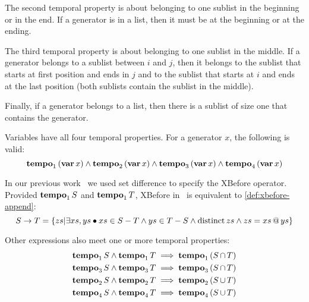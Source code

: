 \documentclass[12pt,openright,twoside,a4paper,oldfontcommands,english,brazil,final]{abntex2}
\makeatletter
\newtheorem{definition}{Definition}[chapter]
\theoremstyle{theo}
\def\varop{\ensuremath\operatorname{\mathbf{var}}}
\newcommand{\var}[1]{\ensuremath\varop #1}
\def\xbeforeop{\ensuremath\rightarrow}
\newcommand{\xbefore}[2]{\ensuremath #1 \xbeforeop #2 }
\def\Tempotext{Tempo\xspace}
\def\tempoop{\ensuremath\operatorname{\mathbf{tempo}}}
\newcommand{\tempo}[2][1-4]{\ensuremath\tempoop_{#1} #2}
\def\distinctop{\ensuremath\operatorname{distinct}}
\newcommand{\distinct}[1]{\ensuremath\distinctop #1}
\newcommand{\append}[2]{\ensuremath #1 \operatorname{\mathbf{@}} #2}
\newcommand{\parsin}[1]{\ensuremath\left( #1 \right)}
\def\union{\ensuremath\operatorname{\cup}}
\def\inter{\ensuremath\operatorname{\cap}}
\makeatother
\begin{document}
The second temporal property is about belonging to one sublist in the beginning or in the end.
If a generator is in a list, then it must be at the beginning or at the ending.
%
%

The third temporal property is about belonging to one sublist in the middle.
If a generator belongs to a sublist between $i$ and $j$, then it belongs to the sublist that starts at first position and ends in $j$ and to the sublist that starts at $i$ and ends at the last position (both sublists contain the sublist in the middle).
%
%

Finally, if a generator belongs to a list, then there is a sublist of size one that contains the generator.
%
%

Variables have all four temporal properties. For a generator $x$, the following is valid:
%
\begin{equation}
\label{law:var-tempo}
\tempo[1]{\left(\var{x}\right)} \land
\tempo[2]{\left(\var{x}\right)} \land
\tempo[3]{\left(\var{x}\right)} \land
\tempo[4]{\left(\var{x}\right)}
\end{equation}

\begin{sloppypar}
In our previous work~\cite{DM2015} we used set difference to specify the \ac{XBefore} operator.
Provided $\tempo[1]{S}$ and $\tempo[1]{T}$, \ac{XBefore} in~\cite{DM2015} is equivalent to \eqref{def:xbefore-append}:
%
\begin{equation}
\label{law:old-xbefore}
\xbefore{S}{T} = \left\{ zs | \exists xs, ys \bullet xs \in S-T \land ys \in T-S \land \distinct{zs} \land zs = \append{xs}{ys}  \right\}
\end{equation}
\end{sloppypar}

Other expressions also meet one or more temporal properties:
\begin{subequations}
\begin{align}
\tempo[1]{S} \land \tempo[1]{T} & \implies \tempo[1]{\parsin{S \inter T}}\label{law:tempo1-inter}\\
\tempo[3]{S} \land \tempo[3]{T} & \implies \tempo[3]{\parsin{S \inter T}}\label{law:tempo3-inter}\\
\tempo[2]{S} \land \tempo[2]{T} & \implies \tempo[2]{\parsin{S \union T}}\label{law:tempo2-union}\\
\tempo[4]{S} \land \tempo[4]{T} & \implies \tempo[4]{\parsin{S \union T}}\label{law:tempo4-union}
\end{align}
\end{subequations}
\end{document}

